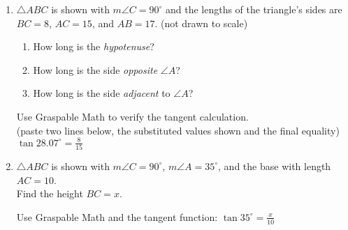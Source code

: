 \begin{enumerate}
\item $\triangle ABC$ is shown with $m\angle C=90^\circ$ and the lengths of the triangle's sides are $BC=8$, $AC=15$, and $AB=17$. (not drawn to scale)
  \begin{multicols}{2}
    \begin{enumerate}
      \item How long is the \emph{hypotenuse}? \vspace{0.75cm}
      \item How long is the side \emph{opposite} $\angle A$? \vspace{0.75cm}
      \item How long is the side \emph{adjacent} to $\angle A$? \vspace{0.75cm}
    \end{enumerate}
    \end{multicols}
    Use Graspable Math to verify the tangent calculation.\\ (paste two lines below, the substituted values shown and the final equality)\\[0.25cm]
      $\displaystyle \tan 28.07^\circ = \frac{8}{15}$

\item $\triangle ABC$ is shown with $m\angle C=90^\circ$, $m\angle A = 35^\circ$, and the base with length $AC=10$.\\[0.25cm]
Find the height $BC=x$. 
\begin{center}
    \end{center}
    Use Graspable Math and the tangent function:
      $\displaystyle \tan 35^\circ = \frac{x}{10}$


\end{enumerate}
